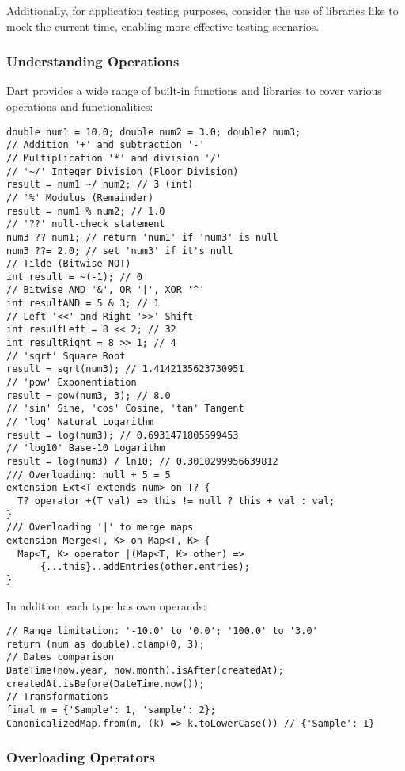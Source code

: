 Additionally, for application testing purposes, consider the use of libraries like  to mock the 
current time, enabling more effective testing scenarios.

\newpage
\subsubsection{Understanding Operations}

Dart provides a wide range of built-in functions and libraries to cover various operations and functionalities:

\begin{lstlisting}
double num1 = 10.0; double num2 = 3.0; double? num3;
// Addition '+' and subtraction '-'
// Multiplication '*' and division '/'
// '~/' Integer Division (Floor Division)
result = num1 ~/ num2; // 3 (int)
// '%' Modulus (Remainder)
result = num1 % num2; // 1.0
// '??' null-check statement
num3 ?? num1; // return 'num1' if 'num3' is null
num3 ??= 2.0; // set 'num3' if it's null
// Tilde (Bitwise NOT)
int result = ~(-1); // 0
// Bitwise AND '&', OR '|', XOR '^'
int resultAND = 5 & 3; // 1
// Left '<<' and Right '>>' Shift
int resultLeft = 8 << 2; // 32
int resultRight = 8 >> 1; // 4
// 'sqrt' Square Root
result = sqrt(num3); // 1.4142135623730951
// 'pow' Exponentiation
result = pow(num3, 3); // 8.0
// 'sin' Sine, 'cos' Cosine, 'tan' Tangent
// 'log' Natural Logarithm
result = log(num3); // 0.6931471805599453
// 'log10' Base-10 Logarithm
result = log(num3) / ln10; // 0.3010299956639812
/// Overloading: null + 5 = 5
extension Ext<T extends num> on T? {
  T? operator +(T val) => this != null ? this + val : val;
}
/// Overloading '|' to merge maps
extension Merge<T, K> on Map<T, K> {
  Map<T, K> operator |(Map<T, K> other) => 
      {...this}..addEntries(other.entries);
}
\end{lstlisting}

\noindent In addition, each type has own operands:

\begin{lstlisting}
// Range limitation: '-10.0' to '0.0'; '100.0' to '3.0'
return (num as double).clamp(0, 3);
// Dates comparison
DateTime(now.year, now.month).isAfter(createdAt);
createdAt.isBefore(DateTime.now());
// Transformations
final m = {'Sample': 1, 'sample': 2};
CanonicalizedMap.from(m, (k) => k.toLowerCase()) // {'Sample': 1}
\end{lstlisting}


\newpage
\subsubsection{Overloading Operators}

